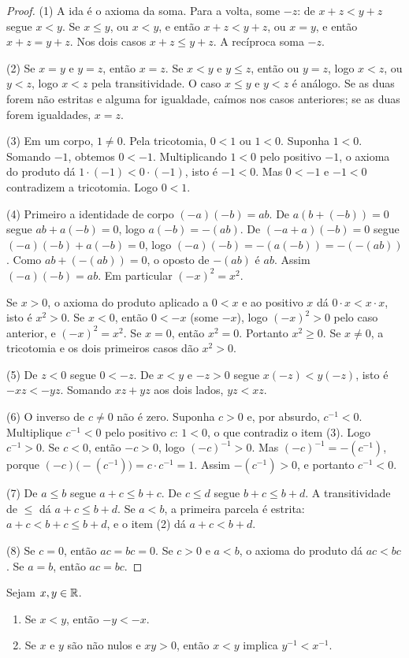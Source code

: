 \documentclass[11pt,a4paper]{article}
\begin{document}
\begin{proof}
(1) A ida é o axioma da soma. Para a volta, some $-z$: de $x+z<y+z$ segue $x<y$. Se $x\le y$, ou $x<y$, e então $x+z<y+z$, ou $x=y$, e então $x+z=y+z$. Nos dois casos $x+z\le y+z$. A recíproca soma $-z$.

(2) Se $x=y$ e $y=z$, então $x=z$. Se $x<y$ e $y\le z$, então ou $y=z$, logo $x<z$, ou $y<z$, logo $x<z$ pela transitividade. O caso $x\le y$ e $y<z$ é análogo. Se as duas forem não estritas e alguma for igualdade, caímos nos casos anteriores; se as duas forem igualdades, $x=z$.

(3) Em um corpo, $1\neq 0$. Pela tricotomia, $0<1$ ou $1<0$. Suponha $1<0$. Somando $-1$, obtemos $0<-1$. Multiplicando $1<0$ pelo positivo $-1$, o axioma do produto dá $1\cdot(-1)<0\cdot(-1)$, isto é $-1<0$. Mas $0<-1$ e $-1<0$ contradizem a tricotomia. Logo $0<1$.

(4) Primeiro a identidade de corpo $(-a)(-b)=ab$. De $a(b+(-b))=0$ segue $ab+a(-b)=0$, logo $a(-b)=-(ab)$. De $(-a+a)(-b)=0$ segue $(-a)(-b)+a(-b)=0$, logo $(-a)(-b)=-(a(-b))=-(-(ab))$. Como $ab+(-(ab))=0$, o oposto de $-(ab)$ é $ab$. Assim $(-a)(-b)=ab$. Em particular $(-x)^2=x^2$.

Se $x>0$, o axioma do produto aplicado a $0<x$ e ao positivo $x$ dá $0\cdot x<x\cdot x$, isto é $x^2>0$. Se $x<0$, então $0<-x$ (some $-x$), logo $(-x)^2>0$ pelo caso anterior, e $(-x)^2=x^2$. Se $x=0$, então $x^2=0$. Portanto $x^2\ge 0$. Se $x\neq 0$, a tricotomia e os dois primeiros casos dão $x^2>0$.

(5) De $z<0$ segue $0<-z$. De $x<y$ e $-z>0$ segue $x(-z)<y(-z)$, isto é $-xz<-yz$. Somando $xz+yz$ aos dois lados, $yz<xz$.

(6) O inverso de $c\neq 0$ não é zero. Suponha $c>0$ e, por absurdo, $c^{-1}<0$. Multiplique $c^{-1}<0$ pelo positivo $c$: $1<0$, o que contradiz o item (3). Logo $c^{-1}>0$. Se $c<0$, então $-c>0$, logo $(-c)^{-1}>0$. Mas $(-c)^{-1}=-(c^{-1})$, porque $(-c)\bigl(-(c^{-1})\bigr)=c\cdot c^{-1}=1$. Assim $-(c^{-1})>0$, e portanto $c^{-1}<0$.

(7) De $a\le b$ segue $a+c\le b+c$. De $c\le d$ segue $b+c\le b+d$. A transitividade de $\le$ dá $a+c\le b+d$. Se $a<b$, a primeira parcela é estrita: $a+c<b+c\le b+d$, e o item (2) dá $a+c<b+d$.

(8) Se $c=0$, então $ac=bc=0$. Se $c>0$ e $a<b$, o axioma do produto dá $ac<bc$. Se $a=b$, então $ac=bc$.
\end{proof}

\begin{teorema}\label{teo:inverso-ordem}
Sejam $x,y\in\mathbb{R}$.
\begin{enumerate}
\item Se $x<y$, então $-y<-x$.
\item Se $x$ e $y$ são não nulos e $xy>0$, então $x<y$ implica $y^{-1}<x^{-1}$.
\end{enumerate}
\end{teorema}
\end{document}
